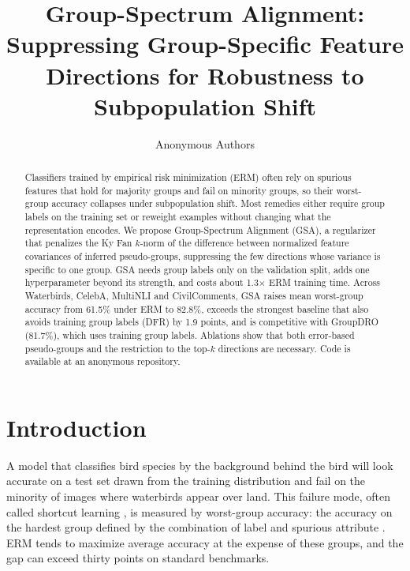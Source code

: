 \documentclass{article}
\title{Group-Spectrum Alignment: Suppressing Group-Specific Feature Directions for Robustness to Subpopulation Shift}
\author{Anonymous Authors}
\date{}
\begin{document}
\maketitle

\begin{abstract}
Classifiers trained by empirical risk minimization (ERM) often rely on spurious features that hold for majority groups and fail on minority groups, so their worst-group accuracy collapses under subpopulation shift. Most remedies either require group labels on the training set or reweight examples without changing what the representation encodes. We propose Group-Spectrum Alignment (GSA), a regularizer that penalizes the Ky Fan $k$-norm of the difference between normalized feature covariances of inferred pseudo-groups, suppressing the few directions whose variance is specific to one group. GSA needs group labels only on the validation split, adds one hyperparameter beyond its strength, and costs about 1.3$\times$ ERM training time. Across Waterbirds, CelebA, MultiNLI and CivilComments, GSA raises mean worst-group accuracy from 61.5\% under ERM to 82.8\%, exceeds the strongest baseline that also avoids training group labels (DFR) by 1.9 points, and is competitive with GroupDRO (81.7\%), which uses training group labels. Ablations show that both error-based pseudo-groups and the restriction to the top-$k$ directions are necessary. Code is available at an anonymous repository.
\end{abstract}

\section{Introduction}
\label{sec:intro}

A model that classifies bird species by the background behind the bird will look accurate on a test set drawn from the training distribution and fail on the minority of images where waterbirds appear over land. This failure mode, often called shortcut learning \citep{geirhos2020shortcut}, is measured by worst-group accuracy: the accuracy on the hardest group defined by the combination of label and spurious attribute \citep{sagawa2020groupdro}. ERM tends to maximize average accuracy at the expense of these groups, and the gap can exceed thirty points on standard benchmarks.
\end{document}
